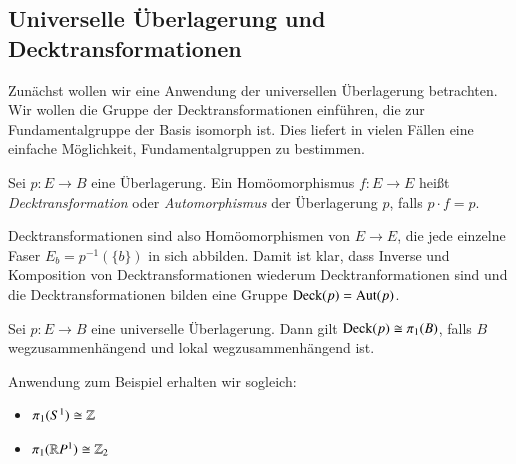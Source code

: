 \documentclass[a4paper,10pt]{scrartcl}
\begin{document}
\subsection{Universelle Überlagerung und Decktransformationen}
Zunächst wollen wir eine Anwendung der universellen Überlagerung betrachten. Wir wollen die Gruppe der Decktransformationen einführen, die zur Fundamentalgruppe der Basis isomorph ist. Dies liefert in vielen Fällen eine einfache Möglichkeit, Fundamentalgruppen zu bestimmen.
\begin{df}
 Sei $p:E\to B$ eine Überlagerung. Ein Homöomorphismus $f:E\to E$ heißt \emph{Decktransformation} oder \emph{Automorphismus} der Überlagerung $p$, falls $p \cdot f=p$.
\end{df}
Decktransformationen sind also Homöomorphismen von $E\to E$, die jede einzelne Faser $E_b=p^{-1}(\{b\})$ in sich abbilden. Damit ist klar, dass Inverse und Komposition von Decktransformationen wiederum Decktranformationen sind und die Decktransformationen bilden eine Gruppe $\operatorname{Deck}(p)=\operatorname{Aut}(p)$.
\begin{st}
 Sei $p:E\to B$ eine universelle Überlagerung. Dann gilt $\operatorname{Deck}(p)\cong \pi_1(B)$, falls $B$ wegzusammenhängend und lokal wegzusammenhängend ist.

\begin{figure}[H]
\centering
 \fixme[fig95]
\caption{}
\end{figure}
\end{st}
\begin{seg}{Anwendung}
 zum Beispiel erhalten wir sogleich:
\begin{itemize}
 \item $\pi_1(S^1)\cong \mathbb{Z}$\\
\begin{figure}[H]
\centering
 \fixme[fig96]
\caption{}
\end{figure}
 \item $\pi_1(\mathbb{R} P^1)\cong \mathbb{Z}_2$

\end{itemize}

\end{seg}
\end{document}
